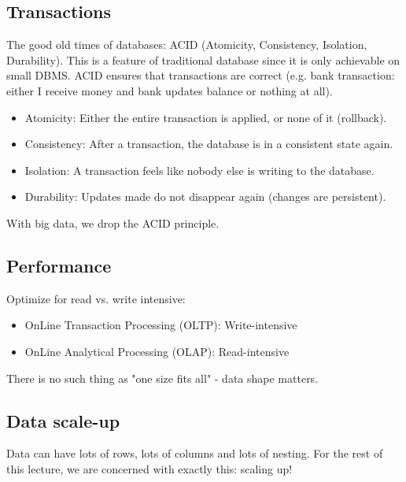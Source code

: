 \documentclass[11pt,oneside,a4paper]{article}
\begin{document}
\subsection{Transactions}

The good old times of databases: ACID (Atomicity, Consistency, Isolation, Durability). This is a feature of traditional database since it is only achievable on small DBMS. ACID ensures that transactions are correct (e.g. bank transaction: either I receive money and bank updates balance or nothing at all). 

\vspace{-\topsep}
\begin{itemize}
	\setlength{\itemsep}{0pt}
	\setlength{\parskip}{0pt}
	\item Atomicity: Either the entire transaction is applied, or none of it (rollback).
	\item Consistency: After a transaction, the database is in a consistent state again.
	\item Isolation: A transaction feels like nobody else is writing to the database.
	\item Durability: Updates made do not disappear again (changes are persistent).
\end{itemize}
\vspace{-\topsep}

With big data, we drop the ACID principle.

\subsection{Performance}

Optimize for read vs. write intensive:
\vspace{-\topsep}
\begin{itemize}
	\setlength{\itemsep}{0pt}
	\setlength{\parskip}{0pt}
	\item OnLine Transaction Processing	(OLTP):	Write-intensive
	\item OnLine Analytical Processing (OLAP): Read-intensive
\end{itemize}

There is no such thing as "one size fits all" - data shape matters.

\subsection{Data scale-up}

Data can have lots of rows, lots of columns and lots of nesting. For the rest of this lecture, we are concerned with exactly this: scaling up!
\end{document}
